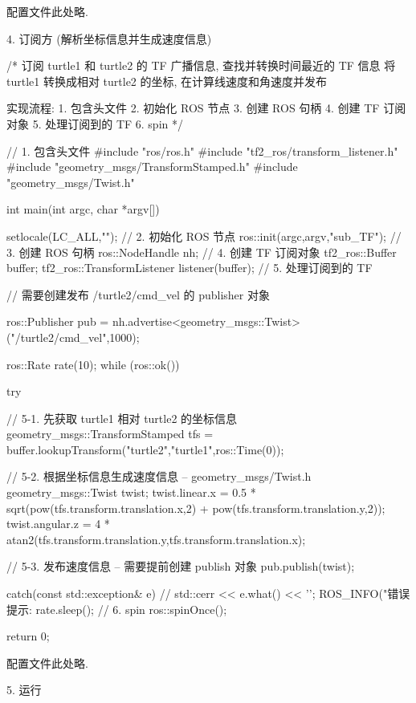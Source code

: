 \documentclass[openany, fontset=windowsold]{ctexbook}
\theoremstyle{kaiti}
\theoremstyle{normal}
\begin{document}
配置文件此处略.

4. 订阅方 (解析坐标信息并生成速度信息)

\begin{cpp}
  /*  
      订阅 turtle1 和 turtle2 的 TF 广播信息, 查找并转换时间最近的 TF 信息
      将 turtle1 转换成相对 turtle2 的坐标, 在计算线速度和角速度并发布

      实现流程:
          1. 包含头文件
          2. 初始化 ROS 节点
          3. 创建 ROS 句柄
          4. 创建 TF 订阅对象
          5. 处理订阅到的 TF
          6. spin
  */

  // 1. 包含头文件
  #include "ros/ros.h"
  #include "tf2_ros/transform_listener.h"
  #include "geometry_msgs/TransformStamped.h"
  #include "geometry_msgs/Twist.h"

  int main(int argc, char *argv[])
  {
      setlocale(LC_ALL,"");
      // 2. 初始化 ROS 节点
      ros::init(argc,argv,"sub_TF");
      // 3. 创建 ROS 句柄
      ros::NodeHandle nh;
      // 4. 创建 TF 订阅对象
      tf2_ros::Buffer buffer;
      tf2_ros::TransformListener listener(buffer);
      // 5. 处理订阅到的 TF

      // 需要创建发布 /turtle2/cmd_vel 的 publisher 对象

      ros::Publisher pub = nh.advertise<geometry_msgs::Twist>("/turtle2/cmd_vel",1000);

      ros::Rate rate(10);
      while (ros::ok())
      {
          try
          {
              // 5-1. 先获取 turtle1 相对 turtle2 的坐标信息
              geometry_msgs::TransformStamped tfs = buffer.lookupTransform("turtle2","turtle1",ros::Time(0));

              // 5-2. 根据坐标信息生成速度信息 -- geometry_msgs/Twist.h
              geometry_msgs::Twist twist;
              twist.linear.x = 0.5 * sqrt(pow(tfs.transform.translation.x,2) + pow(tfs.transform.translation.y,2));
              twist.angular.z = 4 * atan2(tfs.transform.translation.y,tfs.transform.translation.x);

              // 5-3. 发布速度信息 -- 需要提前创建 publish 对象
              pub.publish(twist);
          }
          catch(const std::exception& e)
          {
              // std::cerr << e.what() << '\n';
              ROS_INFO("错误提示:%
          }
          rate.sleep();
          // 6. spin
          ros::spinOnce();
      }
      return 0;
  }
\end{cpp}

配置文件此处略.

5. 运行
\end{document}
